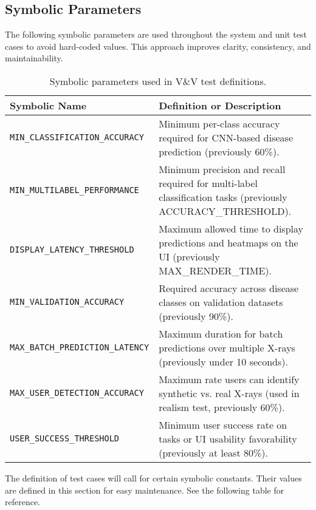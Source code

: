 \documentclass[12pt, titlepage]{article}
\begin{document}
\subsection{Symbolic Parameters}

The following symbolic parameters are used throughout the system and unit test cases to avoid hard-coded values. This approach improves clarity, consistency, and maintainability.

\begin{table}[H]
\centering
\begin{tabular}{|l|p{11cm}|}
\hline
\textbf{Symbolic Name} & \textbf{Definition or Description} \\
\hline
\texttt{MIN\_CLASSIFICATION\_ACCURACY} & Minimum per-class accuracy required for CNN-based disease prediction (previously 60\%). \\
\texttt{MIN\_MULTILABEL\_PERFORMANCE} & Minimum precision and recall required for multi-label classification tasks (previously ACCURACY\_THRESHOLD). \\
\texttt{DISPLAY\_LATENCY\_THRESHOLD} & Maximum allowed time to display predictions and heatmaps on the UI (previously MAX\_RENDER\_TIME). \\
\texttt{MIN\_VALIDATION\_ACCURACY} & Required accuracy across disease classes on validation datasets (previously 90\%). \\
\texttt{MAX\_BATCH\_PREDICTION\_LATENCY} & Maximum duration for batch predictions over multiple X-rays (previously under 10 seconds). \\
\texttt{MAX\_USER\_DETECTION\_ACCURACY} & Maximum rate users can identify synthetic vs. real X-rays (used in realism test, previously 60\%). \\
\texttt{USER\_SUCCESS\_THRESHOLD} & Minimum user success rate on tasks or UI usability favorability (previously at least 80\%). \\
\hline
\end{tabular}
\caption{Symbolic parameters used in V\&V test definitions.}
\end{table}

The definition of test cases will call for certain symbolic constants. Their values are defined in this section for easy maintenance. See the following table for reference.
\end{document}

